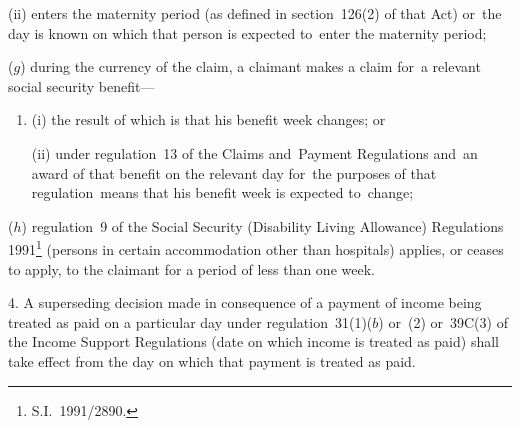 \documentclass[12pt,a4paper]{article}
\begin{document}
\begin{enumerate}
\begin{enumerate}
(ii) enters the maternity period (as defined in section~126(2) of that Act) or~the day is known on which that person is expected to~enter the maternity period;
\end{enumerate}

($g$) during the currency of the claim, a claimant makes a claim for~a relevant social security benefit—
\begin{enumerate}\item[]
(i) the result of which is that his benefit week changes; or

(ii) under regulation~13 of the Claims and~Payment Regulations and~an award of that benefit on the relevant day for~the purposes of that regulation~means that his benefit week is expected to~change;
\end{enumerate}

($h$) regulation~9 of the Social Security (Disability Living Allowance) Regulations 1991\footnote{S.I.~1991/2890.} (persons in certain accommodation other than hospitals) applies, or ceases to apply, to the claimant for a period of less than one week.
\end{enumerate}


\medskip

4.  A superseding decision made in consequence of a payment of income being treated as paid on a particular day under regulation~31(1)($b$)  or~(2) or~39C(3) of the Income Support Regulations (date on which income is treated as paid) shall take effect from the day on which that payment is treated as paid.

\medskip
\end{document}
